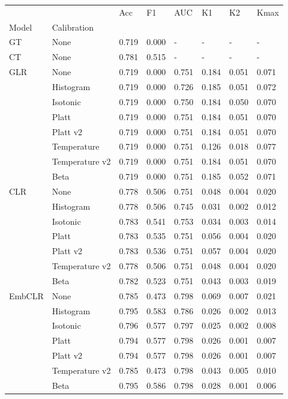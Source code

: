 \begin{tabular}{llllllll}
\toprule
 &  & Acc & F1 & AUC & K1 & K2 & Kmax \\
Model & Calibration &  &  &  &  &  &  \\
\midrule
GT & None & 0.719 & 0.000 & - & - & - & - \\
\cline{1-8}
CT & None & 0.781 & 0.515 & - & - & - & - \\
\cline{1-8}
\multirow[t]{8}{*}{GLR} & None & 0.719 & 0.000 & 0.751 & 0.184 & 0.051 & 0.071 \\
 & Histogram & 0.719 & 0.000 & 0.726 & 0.185 & 0.051 & 0.072 \\
 & Isotonic & 0.719 & 0.000 & 0.750 & 0.184 & 0.050 & 0.070 \\
 & Platt & 0.719 & 0.000 & 0.751 & 0.184 & 0.051 & 0.070 \\
 & Platt v2 & 0.719 & 0.000 & 0.751 & 0.184 & 0.051 & 0.070 \\
 & Temperature & 0.719 & 0.000 & 0.751 & 0.126 & 0.018 & 0.077 \\
 & Temperature v2 & 0.719 & 0.000 & 0.751 & 0.184 & 0.051 & 0.070 \\
 & Beta & 0.719 & 0.000 & 0.751 & 0.185 & 0.052 & 0.071 \\
\cline{1-8}
\multirow[t]{7}{*}{CLR} & None & 0.778 & 0.506 & 0.751 & 0.048 & 0.004 & 0.020 \\
 & Histogram & 0.778 & 0.506 & 0.745 & 0.031 & 0.002 & 0.012 \\
 & Isotonic & 0.783 & 0.541 & 0.753 & 0.034 & 0.003 & 0.014 \\
 & Platt & 0.783 & 0.535 & 0.751 & 0.056 & 0.004 & 0.020 \\
 & Platt v2 & 0.783 & 0.536 & 0.751 & 0.057 & 0.004 & 0.020 \\
 & Temperature v2 & 0.778 & 0.506 & 0.751 & 0.048 & 0.004 & 0.020 \\
 & Beta & 0.782 & 0.523 & 0.751 & 0.043 & 0.003 & 0.019 \\
\cline{1-8}
\multirow[t]{7}{*}{EmbCLR} & None & 0.785 & 0.473 & 0.798 & 0.069 & 0.007 & 0.021 \\
 & Histogram & 0.795 & 0.583 & 0.786 & 0.026 & 0.002 & 0.013 \\
 & Isotonic & 0.796 & 0.577 & 0.797 & 0.025 & 0.002 & 0.008 \\
 & Platt & 0.794 & 0.577 & 0.798 & 0.026 & 0.001 & 0.007 \\
 & Platt v2 & 0.794 & 0.577 & 0.798 & 0.026 & 0.001 & 0.007 \\
 & Temperature v2 & 0.785 & 0.473 & 0.798 & 0.043 & 0.005 & 0.010 \\
 & Beta & 0.795 & 0.586 & 0.798 & 0.028 & 0.001 & 0.006 \\
\cline{1-8}
\bottomrule
\end{tabular}
